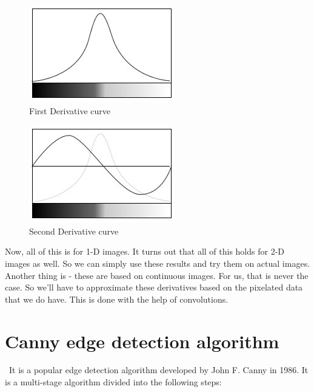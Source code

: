\documentclass[BTech]{srmuthesis}
\begin{document}
\begin{figure}[h!]
    \centering
    \includegraphics[width=10cm\textwidth]{first-derivative-curve}
    \caption{First Derivative curve}
    \label{fig:First Derivative curve}
\end{figure}
\begin{figure}[h!]
    \centering
    \includegraphics[width=10cm\textwidth]{second-derivative-curve}
    \caption{Second Derivative curve}
    \label{fig:Second Derivative curve}
\end{figure}

Now, all of this is for 1-D images. It turns out that all of this holds for 2-D images as well. So we can simply use these results and try them on actual images. Another thing is - these are based on continuous images. For us, that is never the case. So we'll have to approximate these derivatives based on the pixelated data that we do have. This is done with the help of convolutions.

 \section{Canny edge detection algorithm}
\ It is a popular edge detection algorithm developed by John F. Canny in 1986. It is a multi-stage algorithm divided into the following steps:
\end{document}

